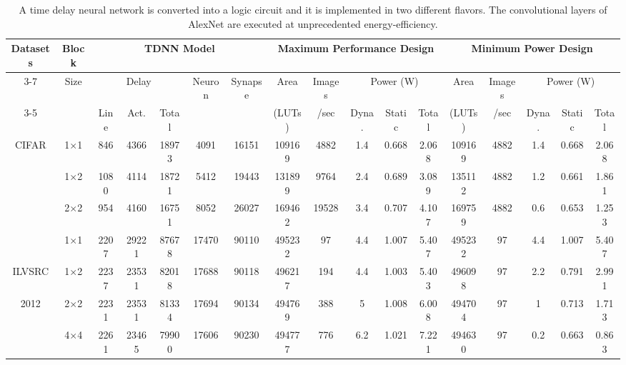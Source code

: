 \documentclass[journal]{IEEEtran}
\begin{document}
\begin{table}\scriptsize
\centering

\caption{A time delay neural network is converted into a logic circuit and it is implemented in two different flavors. The convolutional layers of AlexNet are executed at unprecedented energy-efficiency.}\label{final_table}
\begin{tabular} {|c|c|c|c|c|c|c|c|c|c|c|c|c|c|c|c|c|}
\hline

\multirow{3}{*}{Datasets} & \multirow{2}{*}{Block} & \multicolumn{5}{c|}{TDNN Model} &     \multicolumn{5}{c|}{Maximum Performance Design} & \multicolumn{5}{c|}{Minimum Power Design} \\
\cline{3-7}
\cline{8-17}
&  \multirow{2}{*}{Size} & \multicolumn{3}{c|}{Delay}    & \multirow{2}{*}{Neuron}&\multirow{2}{*}{Synapse} &Area &Images &\multicolumn{3}{c|}{Power (W)} &Area &Images &\multicolumn{3}{c|}{Power (W)} \\
\cline{3-5}
\cline{10-12}
\cline{15-17}
& & Line & Act.&Total&&&(LUTs)&/sec&Dyna.&Static&Total&(LUTs)&/sec &Dyna. &Static&Total\\
\hline

\multirow{2}{*}{CIFAR}& 1$\times$1 &  846 & 4366 & 18973   & 4091 & 16151 & 109169 &4882 & 1.4 &0.668&2.068 & 109169 & 4882 & 1.4 &0.668&2.068\\
\multirow{2}{*}{10}& 1$\times$2 &     1080 & 4114 & 18721    & 5412 & 19443 & 131899  &9764 & 2.4 &0.689&3.089 & 135112 & 4882 & 1.2 &0.661&1.861\\
 & 2$\times$2 &     954 & 4160 & 16751    & 8052 & 26027 & 169462  &19528 & 3.4 &0.707&4.107 & 169759 & 4882 & 0.6 &0.653&1.253\\
\hline
 & 1$\times$1  & 2207 & 29221 & 87678 &17470 & 90110 & 495232 &97 &4.4 & 1.007 & 5.407 &495232&97&4.4&1.007&5.407\\ 
ILVSRC & 1$\times$2 & 2237 & 23531& 82018 &17688 &90118 &496217 &194 &4.4 & 1.003 &5.403 &496098 &97&2.2&0.791 &2.991\\
2012 & 2$\times$2 & 2231 & 23531 & 81334 &17694& 90134  & 494769 &388 &5 & 1.008 &6.008 &494704 &97&1&0.713 &1.713\\
  & 4$\times$4 & 2261 & 23465 & 79900 &17606& 90230 & 494777 &776 &6.2 & 1.021 &7.221 &494630 &97 &0.2 &0.663 &0.863\\

\hline
\end{tabular}
\end{table}
\end{document}
